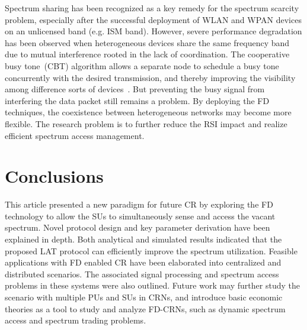 \documentclass[onecolumn,12pt]{IEEEtran}
\begin{document}
Spectrum sharing has been recognized as a key remedy for the spectrum scarcity problem, especially after the successful deployment of WLAN and WPAN devices on an unlicensed band (e.g. ISM band). However, severe performance degradation has been observed when heterogeneous devices share the same frequency band due to mutual interference rooted in the lack of coordination. The cooperative busy tone~(CBT) algorithm allows a separate node to schedule a busy tone concurrently with the desired transmission, and thereby improving the visibility among difference sorts of devices~\cite{Zhang2011}. But preventing the busy signal from interfering the data packet still remains a problem. By deploying the FD techniques, the coexistence between heterogeneous networks may become more flexible. The research problem is to further reduce the RSI impact and realize efficient spectrum access management.

\section{Conclusions}

This article presented a new paradigm for future CR by exploring the FD technology to allow the SUs to simultaneously sense and access the vacant spectrum. Novel protocol design and key parameter derivation have been explained in depth. Both analytical and simulated results indicated that the proposed LAT protocol can efficiently improve the spectrum utilization. Feasible applications with FD enabled CR have been elaborated into centralized and distributed scenarios. The associated signal processing and spectrum access problems in these systems were also outlined. Future work may further study the scenario with multiple PUs and SUs in CRNs, and introduce basic economic theories as a tool to study and analyze FD-CRNs, such as dynamic spectrum access and spectrum trading problems.
\end{document}
